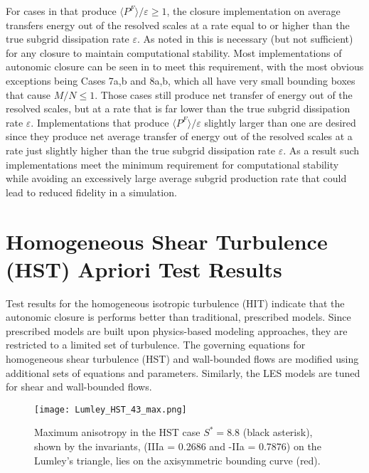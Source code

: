 For cases in  that produce $\langle P^F \rangle/\varepsilon \geq 1$, the closure implementation on average transfers energy out of the resolved scales at a rate equal to or higher than the true subgrid dissipation rate $\varepsilon$. As noted in  this is necessary (but not sufficient) for any closure to maintain computational stability.  Most implementations of autonomic closure can be seen in  to meet this requirement, with the most obvious exceptions being Cases 7a,b and 8a,b, which all have very small bounding boxes that cause $M/N \leq 1$. Those cases still produce net transfer of energy out of the resolved scales, but at a rate that is far lower than the true subgrid dissipation rate $\varepsilon$. Implementations that produce  $\langle P^F \rangle/\varepsilon$  slightly larger than one are desired since they produce net average transfer of energy out of the resolved scales at a rate just slightly higher than the true subgrid dissipation rate $\varepsilon$. As a result such implementations meet the minimum requirement for computational stability while avoiding an excessively large average subgrid production rate that could lead to reduced fidelity in a simulation. 



\section{Homogeneous Shear Turbulence (HST) Apriori Test Results}
\label{sec:IVHST}

Test results for the homogeneous isotropic turbulence (HIT) indicate that the autonomic closure is performs better than traditional, prescribed models.  Since prescribed models are built upon physics-based modeling approaches, they are restricted to a limited set of turbulence. The governing equations for homogeneous shear turbulence (HST) and wall-bounded flows are modified using additional sets of equations and parameters. Similarly, the LES models are tuned for shear and wall-bounded flows. 

%
\begin{figure}
	\begin{center} 
	\texttt{[image: Lumley\_HST\_43\_max.png]}
	\caption{Maximum anisotropy in the HST case $S^* = 8.8$ (black asterisk), shown by the invariants, (IIIa = 0.2686 and -IIa = 0.7876) on the Lumley’s triangle, lies on the axisymmetric bounding curve (red).}
	\label{F:Lumley}
	\end{center}
\end{figure}
%
%

